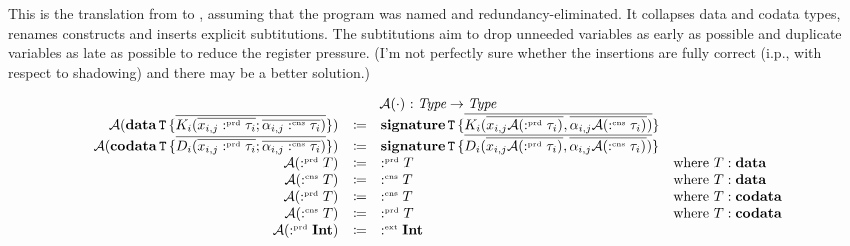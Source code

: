 This is the translation from \targetlang{} to \machinelang, assuming that the program was named and redundancy-eliminated.
It collapses data and codata types, renames constructs and inserts explicit subtitutions.
The subtitutions aim to drop unneeded variables as early as possible and duplicate variables as late as possible to reduce the register pressure.
(I'm not perfectly sure whether the insertions are fully correct (i.p., with respect to shadowing) and there may be a better solution.)

\[
  \begin{array}{rcll}
    \multicolumn{4}{c}{\axcutify{\cdot}{} : \emph{Type} \rightarrow \emph{Type}}\\
    \axcutify{\data{T}{\overline{K_i(\overline{x_{i,j} \prd \tau_i}; \overline{\alpha_{i,j} \cnt \tau_i})}}}{} & \coloneq & \sig{T}{\overline{K_i(\overline{x_{i,j} \axcutify{\prd \tau_i}{}}, \overline{\alpha_{i,j} \axcutify{\cnt \tau_i}{}})}} & \\
    \axcutify{\codata{T}{\overline{D_i(\overline{x_{i,j} \prd \tau_i}; \overline{\alpha_{i,j} \cnt \tau_i})}}}{} & \coloneq & \sig{T}{\overline{D_i(\overline{x_{i,j} \axcutify{\prd \tau_i}{}}, \overline{\alpha_{i,j} \axcutify{\cnt \tau_i}{}})}} & \\
    \axcutify{\prd T}{} & \coloneq & \prd T & \text{where } T : \mathbf{data} \\
    \axcutify{\cnt T}{} & \coloneq & \cnt T & \text{where } T : \mathbf{data} \\
    \axcutify{\prd T}{} & \coloneq & \cnt T & \text{where } T : \mathbf{codata} \\
    \axcutify{\cnt T}{} & \coloneq & \prd T & \text{where } T : \mathbf{codata} \\
    \axcutify{\prd \tyint}{} & \coloneq & \ext \tyint & \\
  \end{array}
\]

